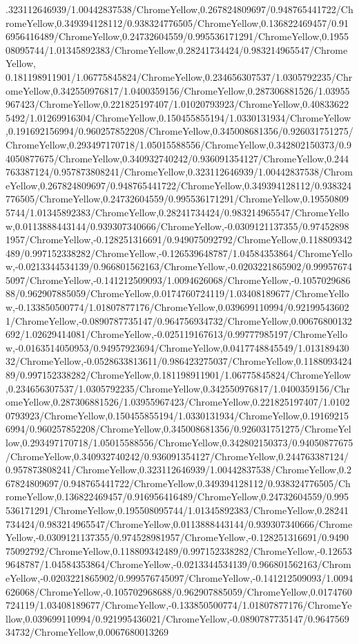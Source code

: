 {\begin{tikzternal}
{.323112646939/1.00442837538/ChromeYellow,0.267824809697/0.948765441722/ChromeYellow,0.349394128112/0.938324776505/ChromeYellow,0.136822469457/0.916956416489/ChromeYellow,0.24732604559/0.995536171291/ChromeYellow,0.195508095744/1.01345892383/ChromeYellow,0.28241734424/0.983214965547/ChromeYellow,
0.181198911901/1.06775845824/ChromeYellow,0.234656307537/1.0305792235/ChromeYellow,0.342550976817/1.0400359156/ChromeYellow,0.287306881526/1.03955967423/ChromeYellow,0.221825197407/1.01020793923/ChromeYellow,0.408336225492/1.01269916304/ChromeYellow,0.150455855194/1.0330131934/ChromeYellow,0.191692156994/0.960257852208/ChromeYellow,0.345008681356/0.926031751275/ChromeYellow,0.293497170718/1.05015588556/ChromeYellow,0.342802150373/0.94050877675/ChromeYellow,0.340932740242/0.936091354127/ChromeYellow,0.244763387124/0.957873808241/ChromeYellow,0.323112646939/1.00442837538/ChromeYellow,0.267824809697/0.948765441722/ChromeYellow,0.349394128112/0.938324776505/ChromeYellow,0.24732604559/0.995536171291/ChromeYellow,0.195508095744/1.01345892383/ChromeYellow,0.28241734424/0.983214965547/ChromeYellow,0.0113888443144/0.939307340666/ChromeYellow,-0.0309121137355/0.974528981957/ChromeYellow,-0.128251316691/0.949075092792/ChromeYellow,0.118809342489/0.997152338282/ChromeYellow,-0.126539648787/1.04584353864/ChromeYellow,-0.0213344534139/0.966801562163/ChromeYellow,-0.0203221865902/0.999576745097/ChromeYellow,-0.141212509093/1.0094626068/ChromeYellow,-0.105702968688/0.962907885059/ChromeYellow,0.0174760724119/1.03408189677/ChromeYellow,-0.133850500774/1.01807877176/ChromeYellow,0.039699110994/0.921995436021/ChromeYellow,-0.0890787735147/0.964756934732/ChromeYellow,0.00676800132692/1.02629414081/ChromeYellow,-0.025119167613/0.99777985197/ChromeYellow,-0.0163514050953/0.94957923694/ChromeYellow,0.0417748845549/1.01318943032/ChromeYellow,-0.0528633813611/0.986423275037/ChromeYellow,0.118809342489/0.997152338282/ChromeYellow,0.181198911901/1.06775845824/ChromeYellow,0.234656307537/1.0305792235/ChromeYellow,0.342550976817/1.0400359156/ChromeYellow,0.287306881526/1.03955967423/ChromeYellow,0.221825197407/1.01020793923/ChromeYellow,0.150455855194/1.0330131934/ChromeYellow,0.191692156994/0.960257852208/ChromeYellow,0.345008681356/0.926031751275/ChromeYellow,0.293497170718/1.05015588556/ChromeYellow,0.342802150373/0.94050877675/ChromeYellow,0.340932740242/0.936091354127/ChromeYellow,0.244763387124/0.957873808241/ChromeYellow,0.323112646939/1.00442837538/ChromeYellow,0.267824809697/0.948765441722/ChromeYellow,0.349394128112/0.938324776505/ChromeYellow,0.136822469457/0.916956416489/ChromeYellow,0.24732604559/0.995536171291/ChromeYellow,0.195508095744/1.01345892383/ChromeYellow,0.28241734424/0.983214965547/ChromeYellow,0.0113888443144/0.939307340666/ChromeYellow,-0.0309121137355/0.974528981957/ChromeYellow,-0.128251316691/0.949075092792/ChromeYellow,0.118809342489/0.997152338282/ChromeYellow,-0.126539648787/1.04584353864/ChromeYellow,-0.0213344534139/0.966801562163/ChromeYellow,-0.0203221865902/0.999576745097/ChromeYellow,-0.141212509093/1.0094626068/ChromeYellow,-0.105702968688/0.962907885059/ChromeYellow,0.0174760724119/1.03408189677/ChromeYellow,-0.133850500774/1.01807877176/ChromeYellow,0.039699110994/0.921995436021/ChromeYellow,-0.0890787735147/0.964756934732/ChromeYellow,0.0067680013269}
\end{tikzternal}}
